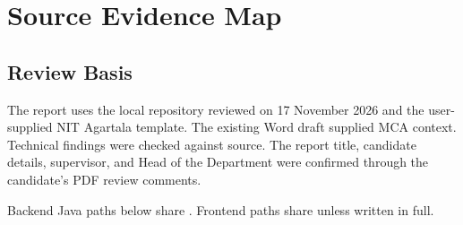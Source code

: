 \chapter{Source Evidence Map}
\section{Review Basis}
The report uses the local repository reviewed on 17 November 2026 and the user-supplied NIT Agartala template. The existing Word draft supplied MCA context. Technical findings were checked against source. The report title, candidate details, supervisor, and Head of the Department were confirmed through the candidate's PDF review comments.

Backend Java paths below share . Frontend paths share  unless written in full.
\begingroup\small{}\setlength{\parskip}{0pt}
